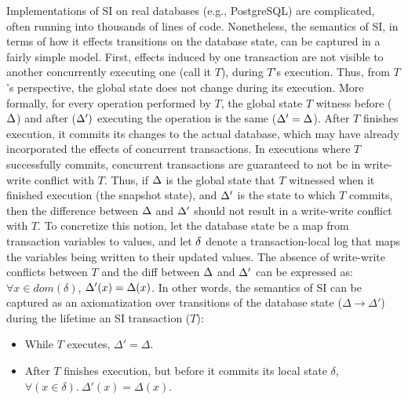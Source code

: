 Implementations of SI on real databases (e.g., PostgreSQL) are
complicated, often running into thousands of lines of code.
Nonetheless, the semantics of SI, in terms of how it effects
transitions on the database state, can be captured in a fairly simple
model. First, effects induced by one transaction are not visible to
another concurrently executing one (call it $T$), during $T$'s
execution. Thus, from $T$'s perspective, the global state does not
change during its execution.  More formally, for every operation
performed by $T$, the global state $T$ witness before ($\Delta$) and
after ($\Delta')$ executing the operation is the same ($\Delta'=\Delta$).
After $T$ finishes execution, it commits its changes to the actual
database, which may have already incorporated the effects of concurrent
transactions. In executions where $T$ successfully commits, concurrent
transactions are guaranteed to not be in write-write conflict with
$T$. Thus, if $\Delta$ is the global state that $T$ witnessed when it
finished execution (the snapshot state), and
$\Delta'$ is the state to which $T$ commits, then the difference between
$\Delta$ and $\Delta'$ should not result in a write-write conflict with $T$. To
concretize this notion, let the database state be a map from
transaction variables to values, and let $\delta$ denote a
transaction-local log that maps the variables being written to their
updated values.  The absence of write-write conflicts between $T$
and the diff between $\Delta$ and $\Delta'$ can be expressed as: $\forall
x\in\mathit{dom}(\delta)$, $\Delta'(x) = \Delta(x)$.  In other words, the
semantics of SI can be captured as an axiomatization over transitions
of the database state ($\Delta \longrightarrow \Delta'$) during the
lifetime an SI transaction ($T$):
\begin{itemize}
  \item While $T$ executes, $\Delta' = \Delta$.
  \item After $T$ finishes execution, but before it commits its local
    state $\delta$, $\forall(x\in\delta).~\Delta'(x) = \Delta(x)$.
\end{itemize}

